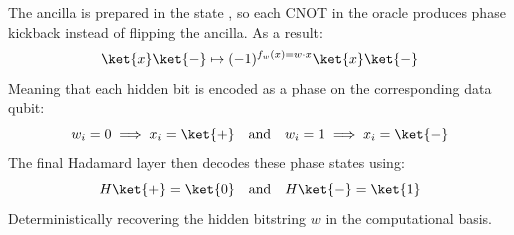 \highspace
\begin{takeawaysbox}
    The ancilla is prepared in the state \ket{-}, so each CNOT in the oracle produces phase kickback instead of flipping the ancilla. As a result:
    \begin{equation*}
        \ket{x}\ket{-} \mapsto (-1)^{f_w(x) = w \cdot x}\ket{x}\ket{-}
    \end{equation*}
    Meaning that each hidden bit is encoded as a phase on the corresponding data qubit:
    \begin{equation*}
        w_i = 0 \implies x_i = \ket{+} \quad \text{and} \quad w_i = 1 \implies x_i = \ket{-}
    \end{equation*}
    The final Hadamard layer then decodes these phase states using:
    \begin{equation*}
        H\ket{+} = \ket{0} \quad \text{and} \quad H\ket{-} = \ket{1}
    \end{equation*}
    Deterministically recovering the hidden bitstring $w$ in the computational basis.
\end{takeawaysbox}